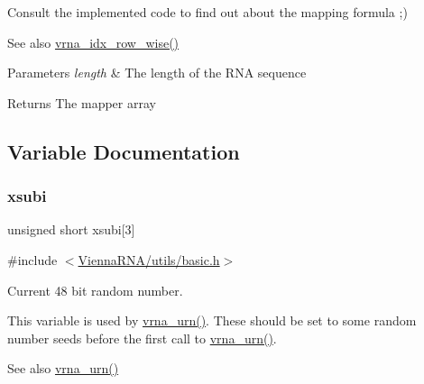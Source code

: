 Consult the implemented code to find out about the mapping formula ;)

\begin{DoxySeeAlso}{See also}
\mbox{\hyperlink{group__utils_ga70b180e9ea764218a82647a1cd347445}{vrna\+\_\+idx\+\_\+row\+\_\+wise()}} 
\end{DoxySeeAlso}

\begin{DoxyParams}{Parameters}
{\em length} & The length of the R\+NA sequence \\
\hline
\end{DoxyParams}
\begin{DoxyReturn}{Returns}
The mapper array 
\end{DoxyReturn}


\subsection{Variable Documentation}
\mbox{\label{group__utils_gaf9a866c8417afda7368bbac939ab3c47}} 
\subsubsection{\texorpdfstring{xsubi}{xsubi}}
{\footnotesize\ttfamily unsigned short xsubi\mbox{[}3\mbox{]}}



{\ttfamily \#include $<$\mbox{\hyperlink{utils_2basic_8h}{Vienna\+R\+N\+A/utils/basic.\+h}}$>$}



Current 48 bit random number. 

This variable is used by \mbox{\hyperlink{group__utils_ga384e256ebb295d04a14426179db0dd6e}{vrna\+\_\+urn()}}. These should be set to some random number seeds before the first call to \mbox{\hyperlink{group__utils_ga384e256ebb295d04a14426179db0dd6e}{vrna\+\_\+urn()}}.

\begin{DoxySeeAlso}{See also}
\mbox{\hyperlink{group__utils_ga384e256ebb295d04a14426179db0dd6e}{vrna\+\_\+urn()}} 
\end{DoxySeeAlso}
